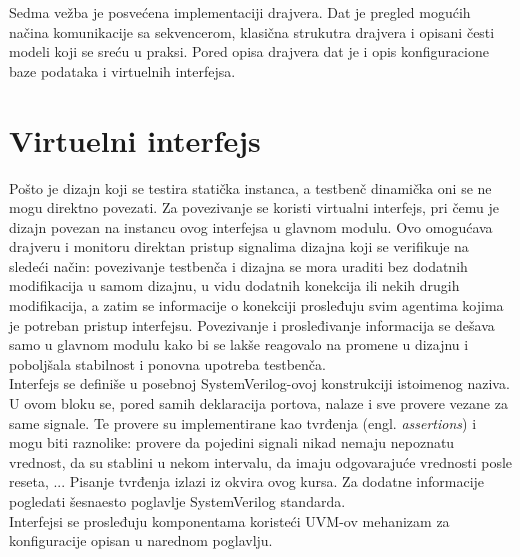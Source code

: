 %
% 

Sedma vežba je posvećena implementaciji drajvera. Dat je pregled mogućih načina
komunikacije sa sekvencerom, klasična strukutra drajvera i opisani česti modeli
koji se sreću u praksi. Pored opisa drajvera dat je i opis konfiguracione baze
podataka i virtuelnih interfejsa.


\section{Virtuelni interfejs}

Pošto je dizajn koji se testira statička instanca, a testbenč dinamička oni se
ne mogu direktno povezati. Za povezivanje se koristi virtualni interfejs, pri
čemu je dizajn povezan na instancu ovog interfejsa u glavnom modulu. Ovo
omogućava drajveru i monitoru direktan pristup signalima dizajna koji se
verifikuje na sledeći način: povezivanje testbenča i dizajna se mora uraditi bez
dodatnih modifikacija u samom dizajnu, u vidu dodatnih konekcija ili nekih
drugih modifikacija, a zatim se informacije o konekciji prosleđuju svim
agentima kojima je potreban pristup interfejsu. Povezivanje i prosleđivanje
informacija se dešava samo u glavnom modulu kako bi se lakše reagovalo na
promene u dizajnu i poboljšala stabilnost i ponovna upotreba testbenča.\\

Interfejs se definiše u posebnoj SystemVerilog-ovoj konstrukciji istoimenog
naziva. U ovom bloku se, pored samih deklaracija portova, nalaze i sve provere
vezane za same signale. Te provere su implementirane kao tvrđenja (engl.
\emph{assertions}) i mogu biti raznolike: provere da pojedini signali nikad
nemaju nepoznatu vrednost, da su stablini u nekom intervalu, da imaju
odgovarajuće vrednosti posle reseta, ... Pisanje tvrđenja izlazi iz okvira ovog
kursa. Za dodatne informacije pogledati šesnaesto poglavlje SystemVerilog
standarda.\\

Interfejsi se prosleđuju komponentama koristeći UVM-ov mehanizam za
konfiguracije opisan u narednom poglavlju.


